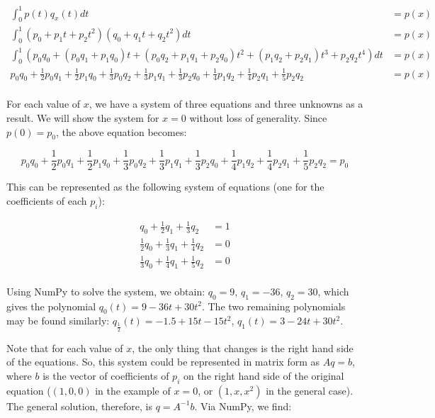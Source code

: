 \documentclass[fleqn]{homework}
\begin{document}
\begin{problem}{4}
\begin{enumerate}[(a)]
      \begin{align*}
        \int_0^1 p(t)q_x(t) dt &= p(x) \\
        \int_0^1 (p_0 + p_1t + p_2t^2)(q_0 + q_1t + q_2t^2)dt &= p(x) \\
        \int_0^1 (p_0q_0 + (p_0q_1 + p_1q_0)t + (p_0q_2 + p_1q_1 + p_2q_0)t^2 + (p_1q_2 + p_2q_1)t^3 + p_2q_2t^4)dt &= p(x) \\
        p_0q_0 + \frac{1}{2}p_0q_1 + \frac{1}{2}p_1q_0 + \frac{1}{3}p_0q_2 + \frac{1}{3}p_1q_1 + \frac{1}{3}p_2q_0 + \frac{1}{4}p_1q_2 + \frac{1}{4}p_2q_1 + \frac{1}{5}p_2q_2 &= p(x) \\
      \end{align*}

      For each value of $x$, we have a system of three equations and three
      unknowns as a result.  We will show the system for $x=0$ without loss of
      generality.  Since $p(0) = p_0$, the above equation becomes:

      \begin{equation*}
        p_0q_0 + \frac{1}{2}p_0q_1 + \frac{1}{2}p_1q_0 + \frac{1}{3}p_0q_2 + \frac{1}{3}p_1q_1 + \frac{1}{3}p_2q_0 + \frac{1}{4}p_1q_2 + \frac{1}{4}p_2q_1 + \frac{1}{5}p_2q_2 = p_0
      \end{equation*}

      This can be represented as the following system of equations (one for the
      coefficients of each $p_i$):

      \begin{align*}
        q_0 + \frac{1}{2} q_1 + \frac{1}{3} q_2 &= 1 \\
        \frac{1}{2}q_0 + \frac{1}{3}q_1 + \frac{1}{4}q_2 &= 0 \\
        \frac{1}{3}q_0 + \frac{1}{4}q_1 + \frac{1}{5}q_2 &= 0 \\
      \end{align*}

      Using NumPy to solve the system, we obtain: $q_0 = 9$, $q_1 = -36$,
      $q_2 = 30$, which gives the polynomial $q_0(t) = 9 - 36t + 30t^2$.  The
      two remaining polynomials may be found similarly:
      $q_{\frac{1}{2}}(t) = -1.5 + 15 t - 15 t^2$, $q_1(t) = 3 - 24t + 30t^2$.

      Note that for each value of $x$, the only thing that changes is the right
      hand side of the equations.  So, this system could be represented in
      matrix form as $Aq = b$, where $b$ is the vector of coefficients of $p_i$
      on the right hand side of the original equation ($(1, 0, 0)$ in the
      example of $x=0$, or $(1, x, x^2)$ in the general case).  The general
      solution, therefore, is $q = A^{-1}b$.  Via NumPy, we find:


\end{enumerate}
\end{problem}
\end{document}
